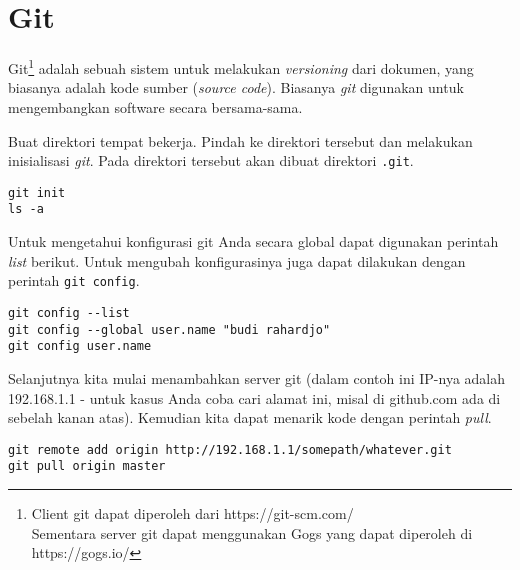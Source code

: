 \chapter{Git}
Git\footnote{Client git dapat diperoleh dari https://git-scm.com/\\
Sementara server git dapat menggunakan Gogs yang dapat diperoleh di
https://gogs.io/}
adalah sebuah sistem untuk melakukan {\em versioning} dari dokumen,
yang biasanya adalah kode sumber ({\em source code}).
Biasanya {\em git} digunakan untuk mengembangkan software secara bersama-sama.

Buat direktori tempat bekerja. Pindah ke direktori tersebut dan
melakukan inisialisasi {\em git}. 
Pada direktori tersebut akan dibuat direktori \texttt{.git}.

\begin{lstlisting}
git init
ls -a
\end{lstlisting}

Untuk mengetahui konfigurasi git Anda secara global dapat digunakan
perintah {\em list} berikut. Untuk mengubah konfigurasinya juga dapat
dilakukan dengan perintah \texttt{git config}.
\begin{lstlisting}
git config --list
git config --global user.name "budi rahardjo"
git config user.name
\end{lstlisting}

Selanjutnya kita mulai menambahkan server git (dalam contoh ini
IP-nya adalah 192.168.1.1 - untuk kasus Anda coba cari alamat ini,
misal di github.com ada di sebelah kanan atas).
Kemudian kita dapat menarik kode dengan perintah {\em pull}.

\begin{lstlisting}
git remote add origin http://192.168.1.1/somepath/whatever.git
git pull origin master
\end{lstlisting}
